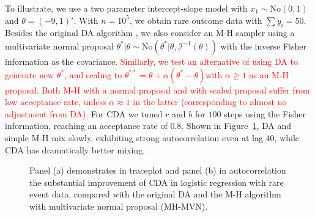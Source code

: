\documentclass[11pt]{article}
\newcommand{\leo}[1]{{\textcolor{red}{#1}}}
\newcommand{\mc}[1]{\mathcal{#1}}
\newcommand{\No}{\text{No}}
\begin{document}
To illustrate, we use a two parameter intercept-slope model with $x_1\sim \No(0,1)$ and $\theta=(-9,1)'$. With $n= 10^5$, we obtain rare outcome data with 
$\sum y_{i} = 50 $.  Besides the original DA algorithm  \citep{polson2013bayesian}, we also consider an M-H sampler using a multivariate normal proposal $\theta^*|\theta \sim \No(\theta^*| \theta, {\mc I}^{-1}(\theta))$ with the inverse Fisher information as the covariance. \leo{Similarly, we test an alternative of using DA to generate new $\theta^*$, and scaling to $\theta^{**}=\theta+\alpha(\theta^{*}-\theta)$with $\alpha\ge 1$ as an M-H proposal. Both M-H with a normal proposal and with scaled proposal suffer from low acceptance rate, unless $\alpha\approx 1$ in the latter (corresponding to almost no adjustment from DA).} For CDA we tuned $r$ and $b$ for $100$ steps using the Fisher information, reaching an acceptance rate of $0.8$.  Shown in Figure~\ref{logit_random_mixing}, DA and simple M-H mix slowly, exhibiting strong autocorrelation even at lag $40$, while CDA has dramatically better mixing.



\begin{figure}[H]
  {\caption{Panel (a) demonstrates in traceplot and panel (b) in autocorrelation the substantial improvement of CDA in logistic regression with rare event data, compared with the original DA \citep{polson2013bayesian} and the M-H algorithm with multivariate normal proposal (MH-MVN).\label{logit_random_mixing}}}
  {%
    \qquad
  }
\end{figure}
\end{document}
